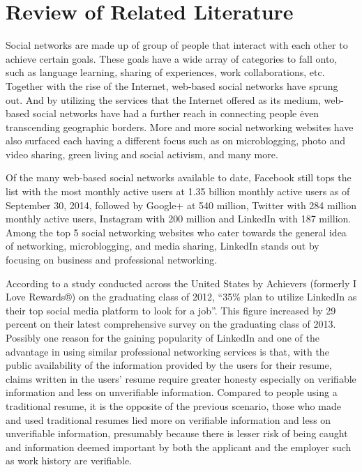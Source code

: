 \documentclass[journal]{./IEEE/IEEEtran}
\begin{document}
\section{Review of Related Literature}
Social networks are made up of group of people that interact with each other to achieve certain goals\cite{wpangako}. These goals have a wide array of categories to fall onto, such as language learning, sharing of experiences, work collaborations, etc.
Together with the rise of the Internet, web-based social networks have sprung out. And by utilizing the services that the Internet offered as its medium, web-based social networks have had a further reach in connecting people \textendash \.even transcending geographic borders\cite{comscore}. More and more social networking websites have also surfaced each having a different focus such as on microblogging, photo and video sharing,  green living and social activism, and many more. \par
Of the many web-based social networks available to date, Facebook still tops the list with the most monthly active users at 1.35 billion monthly active users as of September 30, 2014\cite{fb}, followed by Google+ at 540 million\cite{ny}, Twitter with 284 million monthly active users\cite{twitter}, Instagram with 200 million\cite{insta} and LinkedIn with 187 million\cite{seekingalpha}. Among the top 5 social networking websites who cater towards the general idea of networking, microblogging, and media sharing, LinkedIn stands out by focusing on business and professional networking.\par
According to a study conducted across the United States by Achievers (formerly I Love Rewards®) on the graduating class of 2012, “35\% plan to utilize LinkedIn as their top social media platform to look for a job”\cite{achievers12}. This figure increased by 29 percent on their latest comprehensive survey on the graduating class of 2013\cite{achievers13}. Possibly one reason for the gaining popularity of LinkedIn and one of the advantage in using similar professional networking services is that, with the public availability of the information provided by the users for their resume, claims written in the users’ resume require greater honesty especially on verifiable information and less on unverifiable information. Compared to people using a traditional resume, it is the opposite of the previous scenario, those who made and used traditional resumes lied more on verifiable information and less on unverifiable information, presumably because there is lesser risk of being caught and information deemed important by both the applicant and the employer such as work history are verifiable.\cite{7316265520120301}\par
\end{document}
